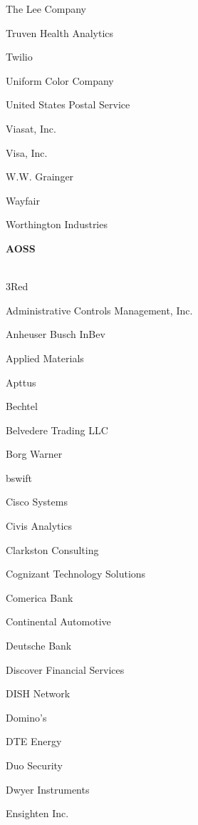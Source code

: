 \documentclass[twoside]{article}
\begin{document}
\begin{center}
\begin{multicols}{5}
\begin{FlushLeft}
\begin{compactitem}
\item The Lee Company
\item Truven Health Analytics
\item Twilio
\item Uniform Color Company
\item United States Postal Service
\item Viasat, Inc.
\item Visa, Inc.
\item W.W. Grainger
\item Wayfair
\item Worthington Industries
\end{compactitem}
        \end{FlushLeft}
        \vspace{1em}
        {\fontsize{14}{16}\selectfont \bf AOSS}\\
        \vspace{-1em}
        ~\hrulefill~
        \vspace{-.9em}
        \begin{FlushLeft}
        \begin{compactitem}
        \item 3Red
\item Administrative Controls Management, Inc.
\item Anheuser Busch InBev
\item Applied Materials
\item Apttus
\item Bechtel
\item Belvedere Trading LLC
\item Borg Warner
\item bswift
\item Cisco Systems
\item Civis Analytics
\item Clarkston Consulting
\item Cognizant Technology Solutions
\item Comerica Bank
\item Continental Automotive
\item Deutsche Bank
\item Discover Financial Services
\item DISH Network
\item Domino's
\item DTE Energy
\item Duo Security
\item Dwyer Instruments
\item Ensighten Inc.

\end{compactitem}
\end{FlushLeft}
\end{multicols}
\end{center}
\end{document}
